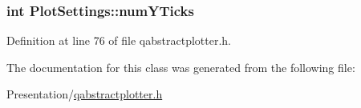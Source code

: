 \hypertarget{class_plot_settings_a8951d83f460971da1fa7d582a510e19c}{}
\subsubsection[{num\+Y\+Ticks}]{\setlength{\rightskip}{0pt plus 5cm}int Plot\+Settings\+::num\+Y\+Ticks}\label{class_plot_settings_a8951d83f460971da1fa7d582a510e19c}


Definition at line 76 of file qabstractplotter.\+h.



The documentation for this class was generated from the following file\+:\begin{DoxyCompactItemize}
\item 
Presentation/\hyperlink{qabstractplotter_8h}{qabstractplotter.\+h}\end{DoxyCompactItemize}
